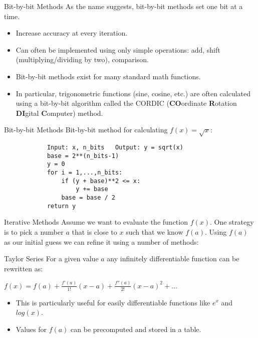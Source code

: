 \documentclass[serif,xcolor=pdftex,dvipsnames,table,hyperref={bookmarks=false,breaklinks}]{beamer}
\begin{document}
\begin{frame}[t]{Bit-by-bit Methods}
	As the name suggests, bit-by-bit methods set one bit at a time.
	\begin{itemize}[<+->]
		\item Increase accuracy at every iteration.
		\item Can often be implemented using only simple operations: add, shift (multiplying/dividing by two), comparison.
		\item Bit-by-bit methods exist for many standard math functions.
		\item In particular, trigonometric functions (sine, cosine, etc.) are often calculated using a bit-by-bit algorithm called the CORDIC (\textbf{CO}ordinate \textbf{R}otation \textbf{DI}gital \textbf{C}omputer) method. 
	\end{itemize}
\end{frame}
	
\begin{frame}[t,fragile]{Bit-by-bit Methods}
	Bit-by-bit method for calculating $f(x) = \sqrt{x}$:
		
	\begin{tcolorbox}
		\begin{verbatim}
			Input: x, n_bits   Output: y = sqrt(x)
			base = 2**(n_bits-1)
			y = 0
			for i = 1,...,n_bits:
			    if (y + base)**2 <= x:
			        y += base
			    base = base / 2	
			return y
		\end{verbatim}
	\end{tcolorbox}
\end{frame}

\begin{frame}[t]{Iterative Methods}
	Assume we want to evaluate the function $f(x)$. One strategy is to pick a number $a$ that is close to $x$ such that we know $f(a)$. Using $f(a)$ as our initial guess we can refine it using a number of methods:

	\pause
	\begin{block}{Taylor Series}
		For a given value $a$ any infinitely differentiable function can be rewritten as:

		\Large
		\centering
		$f(x) = f(a) + \frac{f'(a)}{1!}(x-a) + \frac{f''(a)}{2!}(x-a)^2 + \dots$
	\end{block}

	\pause
	\normalsize
	\begin{itemize}[<+->]
		\item This is particularly useful for easily differentiable functions like $e^x$ and $log(x)$.
		\item Values for $f(a)$ can be precomputed and stored in a table.
	\end{itemize}
\end{frame}
\end{document}

